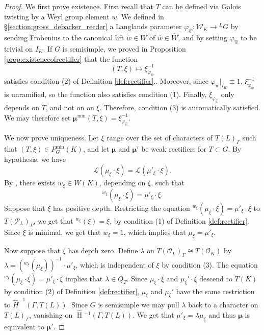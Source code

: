 \documentclass[11pt]{amsart}
\theoremstyle{plain}
\newcommand{\HT}[1]{\hat{\HH}{}^{#1}}
\theoremstyle{definition}
\DeclareMathOperator{\HH}{H}
\newcommand{\OK}{\mathcal{O}_K}
\newcommand{\PL}{\mathcal{P}_L}
\newcommand{\OL}{\mathcal{O}_L}
\newcommand{\Weil}{\mathcal{W}}
\newcommand{\Lpack}{\mathcal{L}}
\newcommand{\Pmin}{P_G^{\min}}
\newcommand{\bmu}{\boldsymbol\mu}
\newcommand{\mumin}{\bmu^{\min}}
\begin{document}
\begin{proof}
We first prove existence.
First recall that $T$ can be defined
via Galois twisting by a Weyl group element $w$.  We defined in
\S\ref{section:gross_debacker_reeder}
a Langlands parameter $\varphi_{\hat{w}} :\Weil _K \rightarrow {}^L G$ by
sending Frobenius to the canonical lift
$\tilde{w} \in \widetilde{W}$ of $\hat{w} \in \hat{W}$, and by setting
$\varphi_{\hat{w}}$ to be trivial on $I_K$.
If $G$ is semisimple,
we proved in Proposition \ref{prop:existenceofrectifier}
that the function $$(T, \xi) \mapsto \xi_{\varphi_{\hat{w}}}^{-1}$$
satisfies condition (2) of Definition \ref{def:rectifier}..  Moreover, since $\varphi_{\hat{w}}|_{I_K} \equiv 1$,
$\xi_{\varphi_{\hat{w}}}^{-1}$ is unramified, so the function also
satisfies condition (1).  Finally, $\xi_{\varphi_{\hat{w}}}$ only depends on $T$,
and not on on $\xi$.  Therefore, condition (3) is automatically satisfied.
We may therefore set
$\mumin(T,\xi) = \xi_{\varphi_{\hat{w}}}^{-1}$.

We now prove uniqueness.
Let $\xi$ range over the set of characters of $T(L)_{\Gamma}$
such that $(T, \xi) \in \Pmin(K)$, and let
$\bmu$ and $\bmu'$ be weak rectifiers for
$T \subset G$.  By hypothesis, we have
$$\Lpack(\mu_{\xi} \cdot \xi) = \Lpack(\mu'_{\xi} \cdot \xi).$$
By \cite[\S10]{murnaghan:11}, there exists $w_{\xi} \in W(K)$,
depending on $\xi$, such that
$${}^{w_{\xi}} (\mu_\xi \cdot \xi) = \mu'_\xi \cdot \xi.$$
Suppose that $\xi$ has positive depth.
Restricting the equation
${}^{w_\xi} (\mu_\xi \cdot \xi) = \mu'_\xi \cdot \xi$
to $T(\PL)_{\Gamma}$, we get that ${}^{w_{\xi}} (\xi) = \xi$,
by condition (1) of Definition \ref{def:rectifier}.
Since $\xi$ is minimal, we get that $w_{\xi} = 1$, which implies
that $\mu_{\xi} = \mu'_{\xi}$.

Now suppose that $\xi$ has depth zero.
Define $\lambda$ on $T(\OL)_{\Gamma} \cong T(\OK)$ by $\lambda = ({}^{w_\xi} (\mu_\xi))^{-1} \cdot \mu'_\xi$,
which is independent of $\xi$ by condition (3). The equation ${}^{w_\xi} (\mu_\xi \cdot \xi) = \mu'_\xi \cdot \xi$
implies that $\lambda \in Q_T$.  Since $\mu_\xi \cdot \xi$ and $\mu_\xi' \cdot \xi$ descend to
$T(K)$ by condition (2) of Definition \ref{def:rectifier}, $\mu_\xi$ and $\mu_\xi'$ have the
same restriction to $\hat{H}^{-1}(\Gamma, T(L))$.  Since $G$ is semisimple we may pull $\lambda$ back to
a character on $T(L)_\Gamma$, vanishing on $\HT{-1}(\Gamma, T(L))$.  We get that $\mu'_\xi = \lambda\mu_\xi$
and thus $\bmu$ is equivalent to $\bmu'$.
\end{proof}
\end{document}
